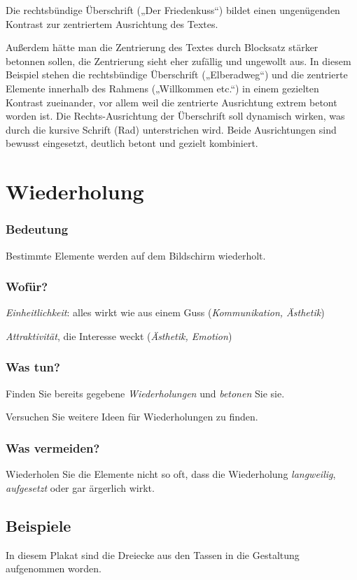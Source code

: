 Die rechtsbündige Überschrift („Der Friedenkuss“) bildet einen ungenügenden Kontrast zur zentriertem Ausrichtung des Textes. 

Außerdem hätte man die Zentrierung des Textes durch Blocksatz stärker betonnen sollen, die Zentrierung sieht eher zufällig und ungewollt aus.
In diesem Beispiel stehen die rechtsbündige Überschrift („Elberadweg“) und die zentrierte Elemente innerhalb des Rahmens („Willkommen etc.“)  in einem gezielten Kontrast zueinander, vor allem weil die zentrierte Ausrichtung extrem betont worden ist. Die Rechts-Ausrichtung der Überschrift soll dynamisch wirken, was durch die kursive Schrift (Rad) unterstrichen wird. Beide Ausrichtungen sind bewusst eingesetzt, deutlich betont und gezielt kombiniert.

\section{Wiederholung}
\subsubsection*{Bedeutung}
Bestimmte Elemente werden auf dem Bildschirm wiederholt.

\subsubsection*{Wofür?}
\emph{Einheitlichkeit}: alles wirkt wie aus einem Guss (\emph{Kommunikation, Ästhetik})

\emph{Attraktivität}, die Interesse weckt (\emph{Ästhetik, Emotion})

\subsubsection*{Was tun?}
Finden Sie bereits gegebene \emph{Wiederholungen} und \emph{betonen} Sie sie.

Versuchen Sie weitere Ideen für Wiederholungen zu finden.

\subsubsection*{Was vermeiden?}
Wiederholen Sie die Elemente nicht so oft, dass die Wiederholung \emph{langweilig}, \emph{aufgesetzt} oder gar ärgerlich wirkt. 

\subsection{Beispiele}
In diesem Plakat sind die Dreiecke aus den Tassen in die Gestaltung aufgenommen worden.

